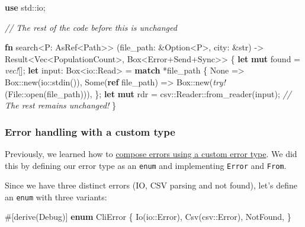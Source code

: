 \documentclass[a4paper,]{book}
\newenvironment{Shaded}{\begin{snugshade}}{\end{snugshade}}
\newcommand{\KeywordTok}[1]{\textcolor[rgb]{0.13,0.29,0.53}{\textbf{{#1}}}}
\newcommand{\DataTypeTok}[1]{\textcolor[rgb]{0.13,0.29,0.53}{{#1}}}
\newcommand{\ConstantTok}[1]{\textcolor[rgb]{0.00,0.00,0.00}{{#1}}}
\newcommand{\CommentTok}[1]{\textcolor[rgb]{0.56,0.35,0.01}{\textit{{#1}}}}
\newcommand{\BuiltInTok}[1]{{#1}}
\newcommand{\PreprocessorTok}[1]{\textcolor[rgb]{0.56,0.35,0.01}{\textit{{#1}}}}
\newcommand{\AttributeTok}[1]{\textcolor[rgb]{0.77,0.63,0.00}{{#1}}}
\newcommand{\NormalTok}[1]{{#1}}
\begin{document}
\begin{Shaded}
\begin{Highlighting}[]
\KeywordTok{use} \NormalTok{std::io;}

\CommentTok{// The rest of the code before this is unchanged}

\KeywordTok{fn} \NormalTok{search<P: AsRef<Path>>}
         \NormalTok{(file_path: &}\DataTypeTok{Option}\NormalTok{<P>, city: &}\DataTypeTok{str}\NormalTok{)}
         \NormalTok{-> }\DataTypeTok{Result}\NormalTok{<}\DataTypeTok{Vec}\NormalTok{<PopulationCount>, }\DataTypeTok{Box}\NormalTok{<Error+}\BuiltInTok{Send}\NormalTok{+}\BuiltInTok{Sync}\NormalTok{>> \{}
    \KeywordTok{let} \KeywordTok{mut} \NormalTok{found = }\PreprocessorTok{vec!}\NormalTok{[];}
    \KeywordTok{let} \NormalTok{input: }\DataTypeTok{Box}\NormalTok{<io::Read> = }\KeywordTok{match} \NormalTok{*file_path \{}
        \ConstantTok{None} \NormalTok{=> }\DataTypeTok{Box}\NormalTok{::new(io::stdin()),}
        \ConstantTok{Some}\NormalTok{(}\KeywordTok{ref} \NormalTok{file_path) => }\DataTypeTok{Box}\NormalTok{::new(}\PreprocessorTok{try!}\NormalTok{(File::open(file_path))),}
    \NormalTok{\};}
    \KeywordTok{let} \KeywordTok{mut} \NormalTok{rdr = csv::Reader::from_reader(input);}
    \CommentTok{// The rest remains unchanged!}
\NormalTok{\}}
\end{Highlighting}
\end{Shaded}

\hypertarget{error-handling-with-a-custom-type}{\subsubsection{Error
handling with a custom type}\label{error-handling-with-a-custom-type}}

Previously, we learned how to
\protect\hyperlink{composing-custom-error-types}{compose errors using a
custom error type}. We did this by defining our error type as an
\texttt{enum} and implementing \texttt{Error} and \texttt{From}.

Since we have three distinct errors (IO, CSV parsing and not found),
let's define an \texttt{enum} with three variants:

\begin{Shaded}
\begin{Highlighting}[]
\AttributeTok{#[}\NormalTok{derive}\AttributeTok{(}\BuiltInTok{Debug}\AttributeTok{)]}
\KeywordTok{enum} \NormalTok{CliError \{}
    \NormalTok{Io(io::Error),}
    \NormalTok{Csv(csv::Error),}
    \NormalTok{NotFound,}
\NormalTok{\}}
\end{Highlighting}
\end{Shaded}
\end{document}
